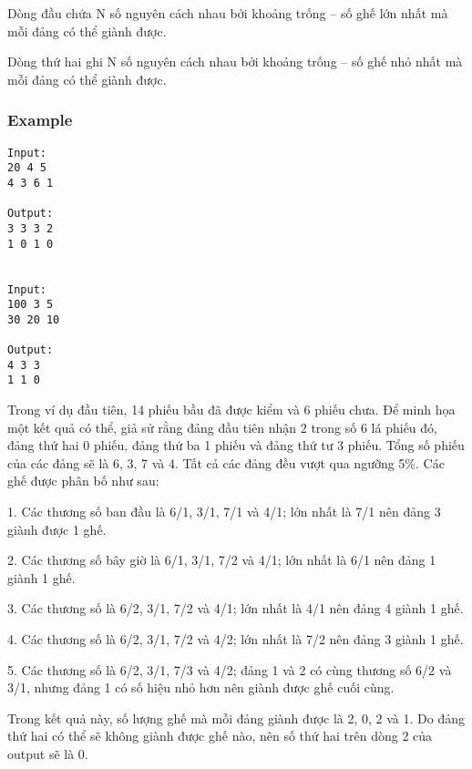   Dòng đầu chứa N số nguyên cách nhau bởi khoảng trống – số ghế lớn nhất mà mỗi đảng có thể giành được.  

   Dòng thứ hai ghi N số nguyên cách nhau bởi khoảng trống – số ghế nhỏ nhất mà mỗi đảng có thể giành được.  

\subsubsection{   Example  }
\begin{verbatim}
Input:
20 4 5
4 3 6 1

Output:
3 3 3 2
1 0 1 0


Input:
100 3 5
30 20 10

Output:
4 3 3
1 1 0

\end{verbatim}

   Trong ví dụ đầu tiên, 14 phiếu bầu đã được kiểm và 6 phiếu chưa. Để minh họa một kết quả có thể, giả sử rằng đảng đầu tiên nhận 2 trong số 6 lá phiếu đó, đảng thứ hai 0 phiếu, đảng thứ ba 1 phiếu và đảng thứ tư 3 phiếu. Tổng số phiếu của các đảng sẽ là 6, 3, 7 và 4. Tất cả các đảng đều vượt qua ngưỡng 5\%. Các ghế được phân bố như sau:  
\begin{itemize}

    1. Các thương số ban đầu là 6/1, 3/1, 7/1 và 4/1; lớn nhất là 7/1 nên đảng 3 giành được 1 ghế.   

    2. Các thương số bây giờ là 6/1, 3/1, 7/2 và 4/1; lớn nhất là 6/1 nên đảng 1 giành 1 ghế.   

    3. Các thương số là 6/2, 3/1, 7/2 và 4/1; lớn nhất là 4/1 nên đảng 4 giành 1 ghế.   

    4. Các thương số là 6/2, 3/1, 7/2 và 4/2; lớn nhất là 7/2 nên đảng 3 giành 1 ghế.   

    5. Các thương số là 6/2, 3/1, 7/3 và 4/2; đảng 1 và 2 có cùng thương số 6/2 và 3/1, nhưng đảng 1 có số hiệu nhỏ hơn nên giành được ghế cuối cùng.   
\end{itemize}

   Trong kết quả này, số lượng ghế mà mỗi đảng giành được là 2, 0, 2 và 1. Do đảng thứ hai có thể sẽ không giành được ghế nào, nên số thứ hai trên dòng 2 của output sẽ là 0.  